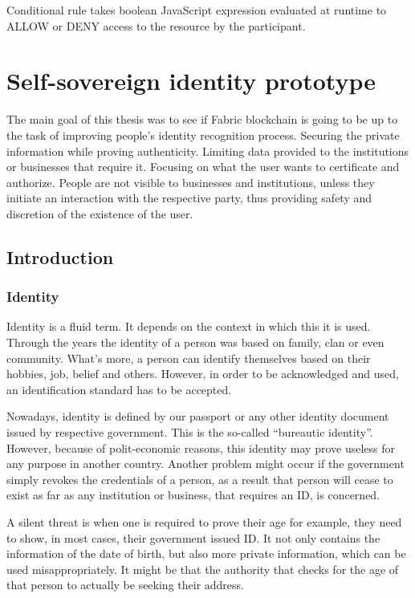 \documentclass[a4paper,11pt]{report}
\begin{document}
Conditional rule takes boolean JavaScript expression evaluated at runtime to ALLOW or DENY access to the resource by the participant.


\chapter{Self-sovereign identity prototype}
\label{usecase}

The main goal of this thesis was to see if Fabric blockchain is going to be up to the task of improving people’s identity recognition process. Securing the private information while proving authenticity. Limiting data provided to the institutions or businesses that require it. Focusing on what the user wants to certificate and authorize. People are not visible to businesses and institutions, unless they initiate an interaction with the respective party, thus providing safety and discretion of the existence of the user.  
  
\section{Introduction}
\subsection{Identity}
 Identity is a fluid term. It depends on the context in which this it is used. Through the years the identity of a person was based on family, clan or even community. What's more, a person can identify themselves based on their hobbies, job, belief and others. However, in order to be acknowledged and used, an identification standard has to be accepted. 

Nowadays, identity is defined by our passport or any other identity document issued by respective government. This is the so-called “bureautic identity”. However, because of polit-economic reasons, this identity may prove useless for any purpose in another country. Another problem might occur if the government simply revokes the credentials of a person, as a result that person will cease to exist as far as any institution or business, that requires an ID, is concerned.

A silent threat is when one is required to prove their age for example, they need to show, in most cases, their government issued ID. It not only contains the information of the date of birth, but also more private information, which can be used misappropriately. It might be that the authority that checks for the age of that person to actually be seeking their address.  
\end{document}
